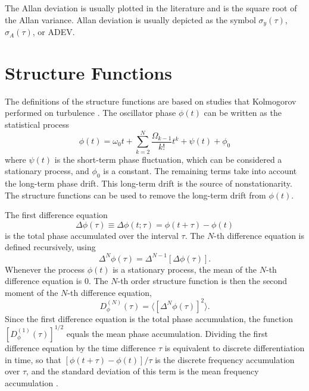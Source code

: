 The Allan deviation is usually plotted in the literature and is the square root of the Allan variance. Allan deviation is usually depicted as the symbol $\sigma_y(\tau)$, $\sigma_A(\tau)$, or ADEV.

\section{Structure Functions} \label{sec:structure}

The definitions of the structure functions are based on studies that Kolmogorov performed on turbulence \cite{Lindsey1976}. The oscillator phase $\phi(t)$ can be written as the statistical process
%
\begin{equation} \label{eq:phaseprocess}
\phi(t) = \omega_0t + \sum_{k=2}^{N} \frac{\Omega_{k-1}}{k!}t^k + \psi(t) + \phi_0
\end{equation}
%
where $\psi(t)$ is the short-term phase fluctuation, which can be considered a stationary process, and $\phi_0$ is a constant. The remaining terms take into account the long-term phase drift. This long-term drift is the source of nonstationarity. The structure functions can be used to remove the long-term drift from $\phi(t)$. 

The first difference equation
%
\begin{equation}
\Delta\phi(\tau) \equiv \Delta\phi(t;\tau) = \phi(t+\tau) - \phi(t)
\end{equation}
%
is the total phase accumulated over the interval $\tau$. The $N$-th difference equation is defined recursively, using
%
\begin{equation}
\Delta^N\phi(\tau) = \Delta^{N-1}\left[\Delta\phi(\tau)\right].
\end{equation}
%
Whenever the process $\phi(t)$ is a stationary process, the mean of the $N$-th difference equation is $0$. The $N$-th order structure function is then the second moment of the $N$-th difference equation,
\begin{equation}
D_\phi^{(N)}(\tau) = \langle [\Delta^N\phi(\tau)]^2 \rangle.
\end{equation}
%
Since the first difference equation is the total phase accumulation, the function $[D_\phi^{(1)}(\tau)]^{1/2}$ equals the mean phase accumulation. Dividing the first difference equation by the time difference $\tau$ is equivalent to discrete differentiation in time, so that $[\phi(t+\tau) - \phi(t)]/\tau$ is the discrete frequency accumulation over $\tau$, and the standard deviation of this term is the mean frequency accumulation \cite{Lindsey1976}.

